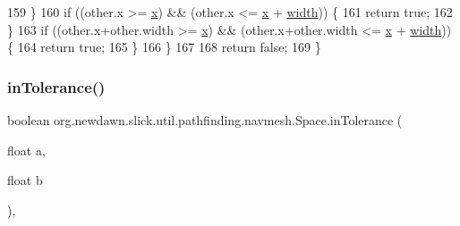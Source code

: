 \begin{DoxyCode}
159             \}
160             \textcolor{keywordflow}{if} ((other.x >= \mbox{\hyperlink{classorg_1_1newdawn_1_1slick_1_1util_1_1pathfinding_1_1navmesh_1_1_space_a314d8d0ed7351fbaaa0a191464e26bfc}{x}}) && (other.x <= \mbox{\hyperlink{classorg_1_1newdawn_1_1slick_1_1util_1_1pathfinding_1_1navmesh_1_1_space_a314d8d0ed7351fbaaa0a191464e26bfc}{x}} + \mbox{\hyperlink{classorg_1_1newdawn_1_1slick_1_1util_1_1pathfinding_1_1navmesh_1_1_space_a503d0a0778ebcb12877f5c432aa97698}{width}})) \{
161                 \textcolor{keywordflow}{return} \textcolor{keyword}{true};
162             \}
163             \textcolor{keywordflow}{if} ((other.x+other.width >= \mbox{\hyperlink{classorg_1_1newdawn_1_1slick_1_1util_1_1pathfinding_1_1navmesh_1_1_space_a314d8d0ed7351fbaaa0a191464e26bfc}{x}}) && (other.x+other.width <= \mbox{\hyperlink{classorg_1_1newdawn_1_1slick_1_1util_1_1pathfinding_1_1navmesh_1_1_space_a314d8d0ed7351fbaaa0a191464e26bfc}{x}} + 
      \mbox{\hyperlink{classorg_1_1newdawn_1_1slick_1_1util_1_1pathfinding_1_1navmesh_1_1_space_a503d0a0778ebcb12877f5c432aa97698}{width}})) \{
164                 \textcolor{keywordflow}{return} \textcolor{keyword}{true};
165             \}
166         \}
167         
168         \textcolor{keywordflow}{return} \textcolor{keyword}{false};
169     \}
\end{DoxyCode}
\mbox{\label{classorg_1_1newdawn_1_1slick_1_1util_1_1pathfinding_1_1navmesh_1_1_space_ab9726ac8b79e58055a8a2199477cffd7}} 
\subsubsection{\texorpdfstring{in\+Tolerance()}{inTolerance()}}
{\footnotesize\ttfamily boolean org.\+newdawn.\+slick.\+util.\+pathfinding.\+navmesh.\+Space.\+in\+Tolerance (\begin{DoxyParamCaption}\item[{float}]{a,  }\item[{float}]{b }\end{DoxyParamCaption})\hspace{0.3cm}{\ttfamily [inline]}, {\ttfamily [private]}}

